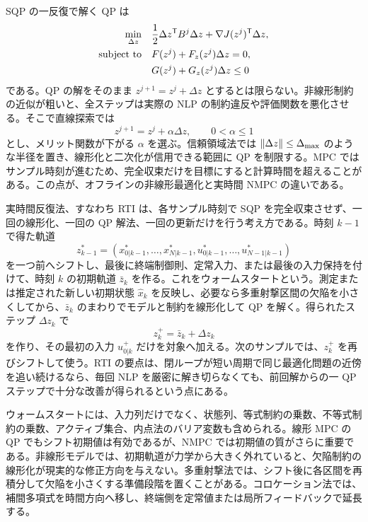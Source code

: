 SQP の一反復で解く QP は
\begin{align}
  \min_{\Delta z}\quad &
  \frac{1}{2}\Delta z^{\mathsf{T}} B^j\Delta z+\nabla J(z^j)^{\mathsf{T}}\Delta z,\\
  \text{subject to}\quad &
  F(z^j)+F_z(z^j)\Delta z=0,\\
  &G(z^j)+G_z(z^j)\Delta z\le0
\end{align}
である。QP の解をそのまま $z^{j+1}=z^j+\Delta z$ とするとは限らない。非線形制約の近似が粗いと、全ステップは実際の NLP の制約違反や評価関数を悪化させる。そこで直線探索では
\begin{equation}
  z^{j+1}=z^j+\alpha\Delta z,
  \qquad
  0<\alpha\le1
\end{equation}
とし、メリット関数が下がる $\alpha$ を選ぶ。信頼領域法では $\left\|\Delta z\right\|\le\Delta_{\max}$ のような半径を置き、線形化と二次化が信用できる範囲に QP を制限する。MPC ではサンプル時刻が進むため、完全収束だけを目標にすると計算時間を超えることがある。この点が、オフラインの非線形最適化と実時間 NMPC の違いである。

実時間反復法、すなわち RTI は、各サンプル時刻で SQP を完全収束させず、一回の線形化、一回の QP 解法、一回の更新だけを行う考え方である。時刻 $k-1$ で得た軌道
\begin{equation}
  z^*_{k-1}
  =
  (x^*_{0|k-1},\ldots,x^*_{N|k-1},
   u^*_{0|k-1},\ldots,u^*_{N-1|k-1})
\end{equation}
を一つ前へシフトし、最後に終端制御則、定常入力、または最後の入力保持を付けて、時刻 $k$ の初期軌道 $\bar{z}_k$ を作る。これをウォームスタートという。測定または推定された新しい初期状態 $\hat{x}_k$ を反映し、必要なら多重射撃区間の欠陥を小さくしてから、$\bar{z}_k$ のまわりでモデルと制約を線形化して QP を解く。得られたステップ $\Delta z_k$ で
\begin{equation}
  z_k^+=\bar{z}_k+\Delta z_k
\end{equation}
を作り、その最初の入力 $u_{0|k}^+$ だけを対象へ加える。次のサンプルでは、$z_k^+$ を再びシフトして使う。RTI の要点は、閉ループが短い周期で同じ最適化問題の近傍を追い続けるなら、毎回 NLP を厳密に解き切らなくても、前回解からの一 QP ステップで十分な改善が得られるという点にある。

ウォームスタートには、入力列だけでなく、状態列、等式制約の乗数、不等式制約の乗数、アクティブ集合、内点法のバリア変数も含められる。線形 MPC の QP でもシフト初期値は有効であるが、NMPC では初期値の質がさらに重要である。非線形モデルでは、初期軌道が力学から大きく外れていると、欠陥制約の線形化が現実的な修正方向を与えない。多重射撃法では、シフト後に各区間を再積分して欠陥を小さくする準備段階を置くことがある。コロケーション法では、補間多項式を時間方向へ移し、終端側を定常値または局所フィードバックで延長する。


